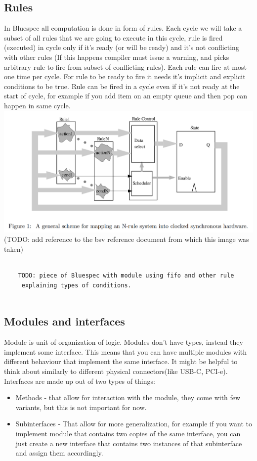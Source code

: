 \documentclass[14pt]{report}
\begin{document}
\subsection{Rules}
 In Bluespec all computation is done in form of rules. Each cycle we will take a subset of all rules that we are going to execute in this cycle, rule is fired (executed) in cycle only if it's ready (or will be ready) and it's not conflicting with other rules (If this happens compiler must issue a warning, and picks arbitrary rule to fire from subset of conflicting rules). Each rule can fire at most one time per cycle. For rule to be ready to fire it needs it's implicit and explicit conditions to be true. Rule can be fired in a cycle even if it's not ready at the start of cycle, for example if you add item on an empty queue and then pop can happen in same cycle. \\
\includegraphics[width=\textwidth]{Rulemapping.png}
(TODO: add reference to the bsv reference document from which this image was taken)
\begin{verbatim}
        
    TODO: piece of Bluespec with module using fifo and other rule
     explaining types of conditions.
    
\end{verbatim}

\subsection{Modules and interfaces}
Module is unit of organization of logic. Modules don't have types, instead they implement some interface. This means that you can have multiple modules with different behaviour that implement the same interface. It might be helpful to think about similarly to different physical connectors(like USB-C, PCI-e). Interfaces are made up out of two types of things:
\begin{itemize}
    \item Methods - that allow for interaction with the module, they come with few variants, but this is not important for now.
    \item Subinterfaces - That allow for more generalization, for example if you want to implement module that contains two copies of the same interface, you can just create a new interface that contains two instances of that subinterface and assign them accordingly.
\end{itemize}
\end{document}
